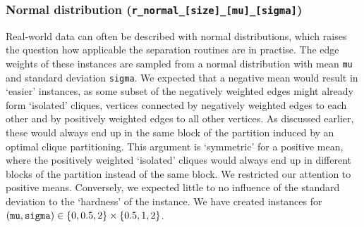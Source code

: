 \subsubsection{Normal distribution (\texttt{r\_normal\_[size]\_[mu]\_[sigma]})}\label{subsubsec:data_random_normal}
Real-world data can often be described with normal distributions, which raises the question how applicable the separation routines are in practise.
The edge weights of these instances are sampled from a normal distribution with mean \texttt{mu} and standard deviation \texttt{sigma}.
We expected that a negative mean would result in ‘easier’ instances, as some subset of the negatively weighted edges might already form ‘isolated’ cliques, \ie vertices connected by negatively weighted edges to each other and by positively weighted edges to all other vertices.
As discussed earlier, these would always end up in the same block of the partition induced by an optimal clique partitioning.
This argument is ‘symmetric’ for a positive mean, where the positively weighted ‘isolated’ cliques would always end up in different blocks of the partition instead of the same block.
We restricted our attention to positive means.
Conversely, we expected little to no influence of the standard deviation to the ‘hardness’ of the instance.
We have created instances for $(\text{\texttt{mu}}, \text{\texttt{sigma}}) \in \left\{ 0, 0.5, 2 \right\} \times \left\{ 0.5, 1, 2 \right\}$.
